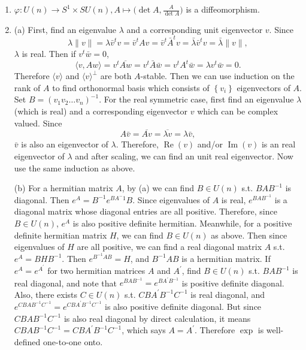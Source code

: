 \begin{enumerate}
then by the lifting property, there is a unique map $\tilde{g}\colon \tilde{G} \rightarrow \tilde{G}$ s.t. $\pi \circ \tilde{g}=g \circ \pi$, 
and since $\tilde{g} \circ g^{-1}=\operatorname{id}_{\tilde{G}}$ by the uniqueness, $\tilde{g} \in A(\tilde{G})$. 
By definition $\tilde{g}(D) \subset D$ and $\tilde{g}(D^{c}) \subset D^{c}$, thus $\tilde{g}(D)=D$ since it is an automorphism. 
Conversely, if $h \in A(\tilde{G})$ and $h(D)=D$, there exists a map $\hat{h}\colon G \rightarrow G$ s.t. $\hat{h} \circ \pi=\pi \circ h$
and it is also an automorphism since $\ker(\pi \circ h)=\ker \pi$. 
Then it is easy to see that $\hat{\tilde{g}}=g$ and $\tilde{\hat{h}}=h$.
\item $\varphi\colon U(n) \rightarrow S^{1} \times SU(n), A \mapsto\big(\!\det A, \frac{A}{\det A}\big)$ is a diffeomorphism.
\item (a) First, find an eigenvalue $\lambda$ and a corresponding unit eigenvector $v$. Since
\[\lambda\|v\|=\lambda \bar{v}^{t} v=\bar{v}^{t} A v
=\bar{v}^{t} \bar{A}^{t} v=\bar{\lambda} \bar{v}^{t} v=\bar{\lambda}\|v\|,\]
$\lambda$ is real. Then if $v^{t} \bar{w}=0$,
\[\langle v, Aw\rangle=v^{t} \overline{Aw}=v^{t} \bar{A} \bar{w}
=v^{t} A^{t} \bar{w}=\lambda v^{t} \bar{w}=0.\]
Therefore $\langle v\rangle$ and $\langle v\rangle^{\perp}$ are both $A$-stable. 
Then we can use induction on the rank of $A$ to find orthonormal basis which consists of $\left\{v_{i}\right\}$ eigenvectors of $A$. 
Set $B=\left(v_{1} v_{2} \ldots v_{n}\right)^{-1}$. 
For the real symmetric case, first find an eigenvalue $\lambda$ (which is real) and a corresponding eigenvector $v$ which can be complex valued. Since
\[A \bar{v}=\overline{A v}=\overline{\lambda v}=\lambda \bar{v},\]
$\bar{v}$ is also an eigenvector of $\lambda$. 
Therefore, $\operatorname{Re}(v)$ and/or $\operatorname{Im}(v)$ is an real eigenvector of $\lambda$ and after scaling, we can find an unit real eigenvector. 
Now use the same induction as above.

(b) For a hermitian matrix $A$, by (a) we can find $B \in U(n)$ s.t. $BAB^{-1}$ is diagonal. 
Then $e^{A}=B^{-1} e^{BA ^{-} 1} B$. 
Since eigenvalues of $A$ is real, $e^{BAB^{-1}}$ is a diagonal matrix whose diagonal entries are all positive. 
Therefore, since $B \in U(n)$, $e^{A}$ is also positive definite hermitian. 
Meanwhile, for a positive definite hermitian matrix $H$, we can find $B \in U(n)$ as above. 
Then since eigenvalues of $H$ are all positive, we can find a real diagonal matrix $A$ s.t. $e^{A}=B H B^{-1}$. 
Then $e^{B^{-1} A B}=H$, and $B^{-1} A B$ is a hermitian matrix. 
If $e^{A}=e^{A^{\prime}}$ for two hermitian matrices $A$ and $A^{\prime}$, 
find $B \in U(n)$ s.t. $B A B^{-1}$ is real diagonal, and note that $e^{B A B^{-1}}=e^{B A^{\prime} B^{-1}}$ is positive definite diagonal. 
Also, there exists $C \in U(n)$ s.t. $CBA^{\prime}B^{-1}C^{-1}$ is real diagonal, 
and $e^{CBAB^{-1}C^{-1}}=e^{CBA^{\prime}B^{-1}C^{-1}}$ is also positive definite diagonal. 
But since $CBAB^{-1}C^{-1}$ is also real diagonal by direct calculation, 
it means $CBAB^{-1}C^{-1}=CBA^{\prime}B^{-1}C^{-1}$, 
which says $A=A^{\prime}$. Therefore $\exp$ is well-defined one-to-one onto.


\end{enumerate}
